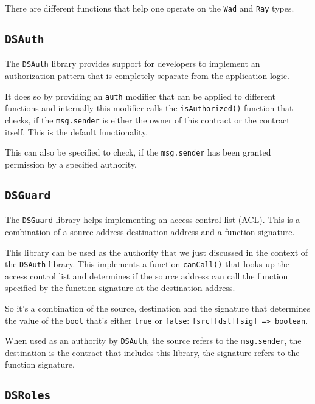 There are different functions that help one operate on the \texttt{Wad}
and \texttt{Ray} types.

\subsection{\texorpdfstring{\texttt{DSAuth}}{DSAuth}}\label{dsauth}

The \texttt{DSAuth} library provides support for developers to implement
an authorization pattern that is completely separate from the
application logic.

It does so by providing an \texttt{auth} modifier that can be applied to
different functions and internally this modifier calls the
\texttt{isAuthorized()} function that checks, if the \texttt{msg.sender}
is either the owner of this contract or the contract itself. This is the
default functionality.

This can also be specified to check, if the \texttt{msg.sender} has been
granted permission by a specified authority.

\subsection{\texorpdfstring{\texttt{DSGuard}}{DSGuard}}\label{dsguard}

The \texttt{DSGuard} library helps implementing an access control list
(ACL). This is a combination of a source address destination address and
a function signature.

This library can be used as the authority that we just discussed in the
context of the \texttt{DSAuth} library. This implements a function
\texttt{canCall()} that looks up the access control list and determines
if the source address can call the function specified by the function
signature at the destination address.

So it's a combination of the source, destination and the signature that
determines the value of the \texttt{bool} that's either \texttt{true} or
\texttt{false}:
\texttt{{[}src{]}{[}dst{]}{[}sig{]}\ =\textgreater{}\ boolean}.

When used as an authority by \texttt{DSAuth}, the source refers to the
\texttt{msg.sender}, the destination is the contract that includes this
library, the signature refers to the function signature.

\subsection{\texorpdfstring{\texttt{DSRoles}}{DSRoles}}\label{dsroles}

